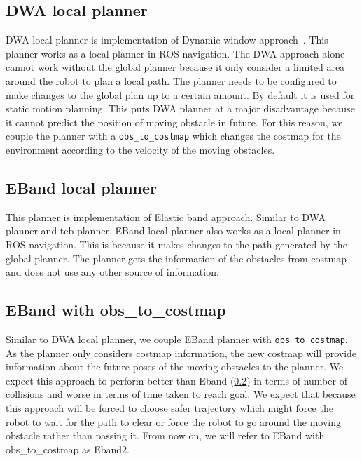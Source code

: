 \subsection{DWA local planner}%
\label{sub:dynamic_window_approach_planner}
DWA local planner\cite{dwa} is implementation of Dynamic window approach~\cite{fox1997dynamic}.
This planner works as a local planner in ROS navigation\cite{rosnavigation}. The DWA approach
alone cannot work without the global planner because it only consider a limited area around
the robot to plan a local path. The planner needs to be configured to make changes to the
global plan up to a certain amount.
By default it is used for static motion planning. This puts DWA planner at a major disadvantage
because it cannot predict the position of moving obstacle in future. 
For this reason, we couple the planner with a \texttt{obs\_to\_costmap} which changes the costmap for the 
environment according to the velocity of the moving obstacles.

\subsection{EBand local planner}%
\label{sub:eband_local_planner}
This planner\cite{eband} is implementation of Elastic band approach\cite{quinlan1993elastic}.
Similar to DWA planner and teb planner, EBand local planner also works as a local planner
in ROS navigation\cite{rosnavigation}. This is because it makes changes to the path generated
by the global planner. 
The planner gets the information of the obstacles from costmap and does not use any other 
source of information.

\subsection{EBand with obs\_to\_costmap}%
\label{sub:eband2_local_planner}
Similar to DWA local planner, we couple EBand planner\cite{eband} with \texttt{obs\_to\_costmap}.
As the planner only considers costmap information, the new costmap will provide information
about the future poses of the moving obstacles to the planner. We expect this approach to 
perform better than Eband (\ref{sub:eband_local_planner}) in terms of number of collisions and worse in
terms of time taken to reach goal. We expect that because this approach will be forced to 
choose safer trajectory which might force the robot to wait for the path to clear or force 
the robot to go around the moving obstacle rather than passing it.
From now on, we will refer to EBand with obs\_to\_costmap as Eband2.

